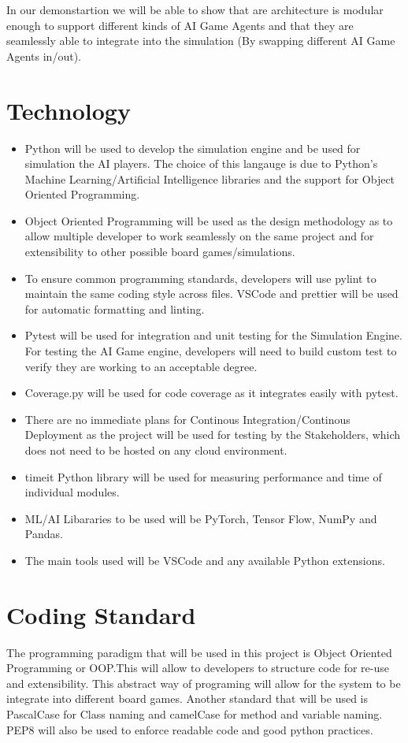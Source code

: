 \documentclass{article}
\begin{document}
In our demonstartion we will be able to show that are architecture is modular enough to support different kinds of AI Game Agents and that they are seamlessly able to integrate into the simulation (By swapping different AI Game Agents in/out).
\section{Technology}

\begin{itemize}
\item Python will be used to develop the simulation engine and be used for simulation the AI players. 
The choice of this langauge is due to Python's Machine Learning/Artificial Intelligence libraries and the support for
 Object Oriented Programming.
\item Object Oriented Programming will be used as the design methodology as to allow multiple developer to work seamlessly 
on the same project and for extensibility to other possible board games/simulations. 
\item To ensure common programming standards, developers will use pylint to maintain the same coding style across files. 
VSCode and prettier will be used for automatic formatting and linting.
\item Pytest will be used for integration and unit testing for the Simulation Engine. For testing the AI Game engine, developers will need to build custom test to verify they are working to an acceptable degree.
\item Coverage.py will be used for code coverage as it integrates easily with pytest.
\item There are no immediate plans for Continous Integration/Continous Deployment as the project will be used for testing by the 
Stakeholders, which does not need to be hosted on any cloud environment.
\item timeit Python library will be used for measuring performance and time of individual modules.
\item ML/AI Libararies to be used will be PyTorch, Tensor Flow, NumPy and Pandas.
\item The main tools used will be VSCode and any available Python extensions.
\end{itemize}

\section{Coding Standard}
The programming paradigm that will be used in this project is Object Oriented Programming or OOP.This will allow to developers to structure code
for re-use and extensibility. This abstract way of programing will allow for the system to be integrate into different board games. Another standard that
will be used is PascalCase for Class naming and camelCase for method and variable naming. PEP8 will also be used to enforce readable code and good python practices.
\end{document}
